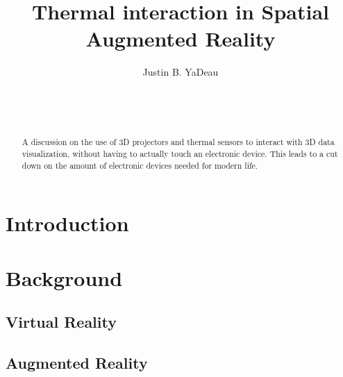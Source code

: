 \documentclass{sig-alternate}
\begin{document}

\title{Thermal interaction in Spatial Augmented Reality}


\author{
\alignauthor
Justin B. YaDeau\\
	\\
	\\
	\\
}

\maketitle
\begin{abstract}
A discussion on the use of 3D projectors and thermal sensors to interact with 3D data visualization, without having to actually touch an electronic device. This leads to a cut down on the amount of electronic devices needed for modern life.
\end{abstract}


\section{Introduction}
\label{sec:introduction}

\section{Background}
\label{sec:background}

\subsection{Virtual Reality}
\label{sec:Virtual Reality}

\subsection{Augmented Reality}
\label{sec:Augmented Reality}
\end{document}
